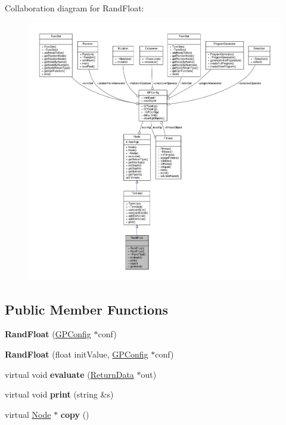 Collaboration diagram for Rand\+Float\+:
\nopagebreak
\begin{figure}[H]
\begin{center}
\leavevmode
\includegraphics[width=350pt]{classRandFloat__coll__graph}
\end{center}
\end{figure}
\subsection*{Public Member Functions}
\begin{DoxyCompactItemize}
\item 
\hypertarget{classRandFloat_a5e94dcef866954df6b152fb8d2a5e5b7}{}\label{classRandFloat_a5e94dcef866954df6b152fb8d2a5e5b7} 
{\bfseries Rand\+Float} (\hyperlink{classGPConfig}{G\+P\+Config} $\ast$conf)
\item 
\hypertarget{classRandFloat_abb7becde66cc9884bfa23dc8b73b40be}{}\label{classRandFloat_abb7becde66cc9884bfa23dc8b73b40be} 
{\bfseries Rand\+Float} (float init\+Value, \hyperlink{classGPConfig}{G\+P\+Config} $\ast$conf)
\item 
\hypertarget{classRandFloat_a6207a53aae9ddde61b4df865a12a5761}{}\label{classRandFloat_a6207a53aae9ddde61b4df865a12a5761} 
virtual void {\bfseries evaluate} (\hyperlink{classReturnData}{Return\+Data} $\ast$out)
\item 
\hypertarget{classRandFloat_a1080521794c25b5ab881dab1d829bb80}{}\label{classRandFloat_a1080521794c25b5ab881dab1d829bb80} 
virtual void {\bfseries print} (string \&s)
\item 
\hypertarget{classRandFloat_a1c86fd91edd14ffef050a9b610cfec17}{}\label{classRandFloat_a1c86fd91edd14ffef050a9b610cfec17} 
virtual \hyperlink{classNode}{Node} $\ast$ {\bfseries copy} ()
\end{DoxyCompactItemize}

